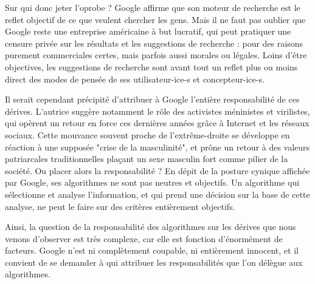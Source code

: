 \documentclass[a4paper,12pt]{article}
\begin{document}
Sur qui donc jeter l'oprobe ? Google affirme que son moteur de recherche est le reflet objectif de ce que veulent chercher les gens. Mais il ne faut pas oublier que Google reste une entreprise américaine à but lucratif, qui peut pratiquer une censure privée sur les résultats et les suggestions de recherche : pour des raisons purement commerciales certes, mais parfois aussi morales ou légales. Loins d'être objectives, les suggestions de recherche sont avant tout un reflet plus ou moins direct des modes de pensée de ses utilisateur-ice-s et concepteur-ice-s.

Il serait cependant précipité d'attribuer à Google l'entière responsabilité de ces dérives. L'autrice suggère notamment le rôle des activistes méninistes et virilistes, qui opèrent un retour en force ces dernières années grâce à Internet et les réseaux sociaux. Cette mouvance souvent proche de l'extrême-droite se développe en réaction à une supposée "crise de la masculinité", et prône un retour à des valeurs patriarcales traditionnelles plaçant un sexe masculin fort comme pilier de la société. Ou placer alors la responsabilité ? En dépit de la posture cynique affichée par Google, ses algorithmes ne sont pas neutres et objectifs. Un algorithme qui sélectionne et analyse l'information, et qui prend une décision sur la base de cette analyse, ne peut le faire sur des critères entièrement objectifs. 

Ainsi, la question de la responsabilité des algorithmes sur les dérives que nous venons d'observer est très complexe, car elle est fonction d'énormément de facteurs. Google n'est ni complètement coupable, ni entièrement innocent, et il convient de se demander à qui attribuer les responsabilités que l'on délègue aux algorithmes.
\end{document}
